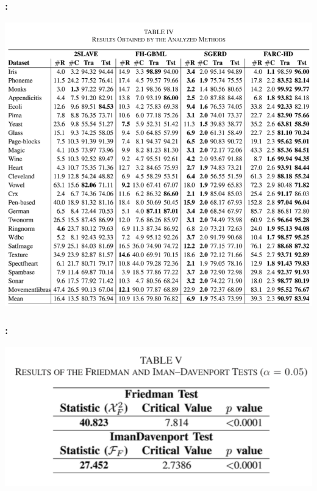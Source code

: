 \documentclass{beamer}
\begin{document}
\begin{CJK*}{UTF8}{bsmi}
\begin{frame}
	\frametitle{\insertsection : \insertsubsection}
	\begin{center}
		\includegraphics[height=.75\textheight]{./12.png}
	\end{center}
\end{frame}


\begin{frame}
	\frametitle{\insertsection : \insertsubsection}
\begin{center}
\includegraphics[width=1\linewidth]{./13.png}
\end{center}
\end{frame}



\end{CJK*}
\end{document}
